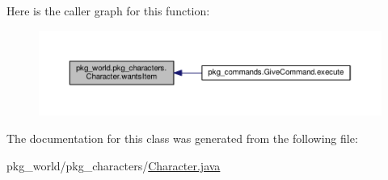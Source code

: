 Here is the caller graph for this function\-:\nopagebreak
\begin{figure}[H]
\begin{center}
\leavevmode
\includegraphics[width=350pt]{classpkg__world_1_1pkg__characters_1_1Character_a816f8f79ef1e8c9635f0cdeb180b9f3f_icgraph}
\end{center}
\end{figure}




The documentation for this class was generated from the following file\-:\begin{DoxyCompactItemize}
\item 
pkg\-\_\-world/pkg\-\_\-characters/\hyperlink{Character_8java}{Character.\-java}\end{DoxyCompactItemize}
